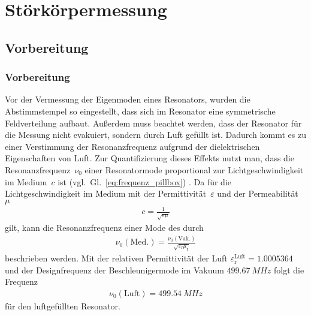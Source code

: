 \chapter{Störkörpermessung}
\label{sec:stoerkoerpermessung}
\section{Vorbereitung}
\subsection{Vorbereitung}

Vor der Vermessung der Eigenmoden eines Resonators, wurden die Abstimmstempel so eingestellt, dass sich im Resonator eine symmetrische Feldverteilung aufbaut.
Außerdem muss beachtet werden, dass der Resonator für die Messung nicht evakuiert, sondern durch Luft gefüllt ist.
Dadurch kommt es zu einer Verstimmung der Resonanzfrequenz aufgrund der dielektrischen Eigenschaften von Luft.
Zur Quantifizierung dieses Effekts nutzt man, dass die Resonanzfrequenz~$\nu_0$ einer Resonatormode proportional zur Lichtgeschwindigkeit im Medium~$c$ ist (vgl.~Gl.~\eqref{eq:frequenz_pillbox}) \cite{pusch}.
Da für die Lichtgeschwindigkeit im Medium mit der Permittivität~$\varepsilon$ und der Permeabilität~$\mu$ 
\begin{align}
	c = \frac{1}{\sqrt{\varepsilon \mu}}
\end{align}
gilt, kann die Resonanzfrequenz einer Mode des durch
\begin{align}
	\nu_0(\mathrm{Med.}) = \frac{\nu_0(\mathrm{Vak.})}{\sqrt{\varepsilon_\mathrm{r} \mu_\mathrm{r}}}
\end{align}
beschrieben werden.
Mit der relativen Permittivität der Luft $\varepsilon_\mathrm{r}^\mathrm{Luft} = \num{1.0005364}$ \cite{CRC} und der Designfrequenz der Beschleunigermode im Vakuum $\SI{499.67}{MHz}$ folgt die Frequenz
\begin{align}
	\nu_0(\mathrm{Luft}) = \SI{499.54}{MHz}
\end{align}
für den luftgefüllten Resonator.

